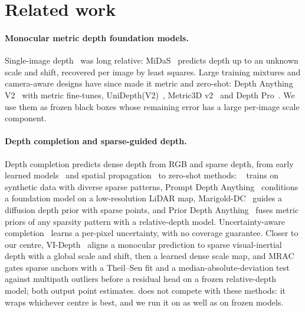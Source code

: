 \section{Related work}
\label{sec:related}

\paragraph{Monocular metric depth foundation models.}
Single-image depth~\cite{eigen2014depth} was long relative: MiDaS~\cite{ranftl2022midas} predicts depth up to an unknown scale and shift, recovered per image by least squares.
Large training mixtures and camera-aware designs have since made it metric and zero-shot: Depth Anything V2~\cite{yang2024dav2} with metric fine-tunes, UniDepth(V2)~\cite{piccinelli2024unidepth,piccinelli2025unidepthv2}, Metric3D v2~\cite{hu2024metric3dv2} and Depth Pro~\cite{bochkovskii2025depthpro}.
We use them as frozen black boxes whose remaining error has a large per-image scale component.

\paragraph{Depth completion and sparse-guided depth.}
Depth completion predicts dense depth from RGB and sparse depth, from early learned models~\cite{ma2018sparse,uhrig2017sparsity} and spatial propagation~\cite{cheng2018cspn,park2020nlspn} to zero-shot methods: \omnidc~\cite{zuo2025omnidc} trains on synthetic data with diverse sparse patterns, Prompt Depth Anything~\cite{lin2025promptda} conditions a foundation model on a low-resolution LiDAR map, Marigold-DC~\cite{viola2025marigolddc} guides a diffusion depth prior with sparse points, and Prior Depth Anything~\cite{wang2025priorda} fuses metric priors of any sparsity pattern with a relative-depth model.
Uncertainty-aware completion~\cite{eldesokey2020uncertainty,qu2021bdbf} learns a per-pixel uncertainty, with no coverage guarantee.
Closer to our centre, VI-Depth~\cite{wofk2023videpth} aligns a monocular prediction to sparse visual-inertial depth with a global scale and shift, then a learned dense scale map, and MRAC~\cite{roy2026mrac} gates sparse anchors with a Theil--Sen fit and a median-absolute-deviation test against multipath outliers before a residual head on a frozen relative-depth model; both output point estimates.
\mDual does not compete with these methods: it wraps whichever centre is best, and we run it on \omnidc as well as on frozen models.

